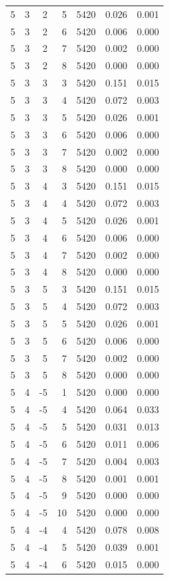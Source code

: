 \begin{table}
\begin{tabular}{rrrrrrr}
5 & 3 & 2 & 5 & 5420 & 0.026 & 0.001 \\
5 & 3 & 2 & 6 & 5420 & 0.006 & 0.000 \\
5 & 3 & 2 & 7 & 5420 & 0.002 & 0.000 \\
5 & 3 & 2 & 8 & 5420 & 0.000 & 0.000 \\
5 & 3 & 3 & 3 & 5420 & 0.151 & 0.015 \\
5 & 3 & 3 & 4 & 5420 & 0.072 & 0.003 \\
5 & 3 & 3 & 5 & 5420 & 0.026 & 0.001 \\
5 & 3 & 3 & 6 & 5420 & 0.006 & 0.000 \\
5 & 3 & 3 & 7 & 5420 & 0.002 & 0.000 \\
5 & 3 & 3 & 8 & 5420 & 0.000 & 0.000 \\
5 & 3 & 4 & 3 & 5420 & 0.151 & 0.015 \\
5 & 3 & 4 & 4 & 5420 & 0.072 & 0.003 \\
5 & 3 & 4 & 5 & 5420 & 0.026 & 0.001 \\
5 & 3 & 4 & 6 & 5420 & 0.006 & 0.000 \\
5 & 3 & 4 & 7 & 5420 & 0.002 & 0.000 \\
5 & 3 & 4 & 8 & 5420 & 0.000 & 0.000 \\
5 & 3 & 5 & 3 & 5420 & 0.151 & 0.015 \\
5 & 3 & 5 & 4 & 5420 & 0.072 & 0.003 \\
5 & 3 & 5 & 5 & 5420 & 0.026 & 0.001 \\
5 & 3 & 5 & 6 & 5420 & 0.006 & 0.000 \\
5 & 3 & 5 & 7 & 5420 & 0.002 & 0.000 \\
5 & 3 & 5 & 8 & 5420 & 0.000 & 0.000 \\
5 & 4 & -5 & 1 & 5420 & 0.000 & 0.000 \\
5 & 4 & -5 & 4 & 5420 & 0.064 & 0.033 \\
5 & 4 & -5 & 5 & 5420 & 0.031 & 0.013 \\
5 & 4 & -5 & 6 & 5420 & 0.011 & 0.006 \\
5 & 4 & -5 & 7 & 5420 & 0.004 & 0.003 \\
5 & 4 & -5 & 8 & 5420 & 0.001 & 0.001 \\
5 & 4 & -5 & 9 & 5420 & 0.000 & 0.000 \\
5 & 4 & -5 & 10 & 5420 & 0.000 & 0.000 \\
5 & 4 & -4 & 4 & 5420 & 0.078 & 0.008 \\
5 & 4 & -4 & 5 & 5420 & 0.039 & 0.001 \\
5 & 4 & -4 & 6 & 5420 & 0.015 & 0.000 \\

\end{tabular}
\end{table}
